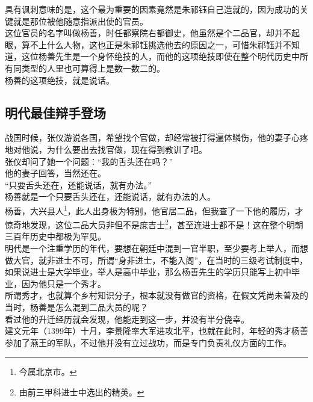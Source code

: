\begin{multicols}{\theparacolNo}
具有讽刺意味的是，这个最为重要的因素竟然是朱祁钰自己造就的，因为成功的关键就是那位被他随意指派出使的官员。\\

这位官员的名字叫做杨善，时任都察院右都御史，他虽然是个二品官，却并不起眼，算不上什么人物，这也正是朱祁钰挑选他去的原因之一，可惜朱祁钰并不知道，这位杨善先生是一个身怀绝技的人，而他的这项绝技即使在整个明代历史中所有同类型的人里也可算得上是数一数二的。\\

杨善的这项绝技，就是说话。\\

\subsection{明代最佳辩手登场}
战国时候，张仪游说各国，希望找个官做，却经常被打得遍体鳞伤，他的妻子心疼地对他说，为什么要出去找官做，现在得到教训了吧。\\

张仪却问了她一个问题：“我的舌头还在吗？”\\

他的妻子回答，当然还在。\\

“只要舌头还在，还能说话，就有办法。”\\

杨善就是一个只要舌头还在，还能说话，就有办法的人。\\

杨善，大兴县人\footnote{今属北京市。}，此人出身极为特别，他官居二品，但我查了一下他的履历，才惊奇地发现，这位二品大员非但不是庶吉士\footnote{由前三甲科进士中选出的精英。}，甚至连进士都不是！这在整个明朝三百年历史中都极为罕见。\\

明代是一个注重学历的年代，要想在朝廷中混到一官半职，至少要考上举人，而想做大官，就非进士不可，所谓“身非进士，不能入阁”，在当时的三级考试制度中，如果说进士是大学毕业，举人是高中毕业，那么杨善先生的学历只能写上初中毕业，因为他只是一个秀才。\\

所谓秀才，也就算个乡村知识分子，根本就没有做官的资格，在假文凭尚未普及的当时，杨善是怎么混到二品大员的呢？\\

看过他的升迁经历就会发现，他能走到这一步，并没有半分侥幸。\\

建文元年（1399年）十月，李景隆率大军进攻北平，也就在此时，年轻的秀才杨善参加了燕王的军队，不过他并没有立过战功，而是专门负责礼仪方面的工作。\\


\end{multicols}
